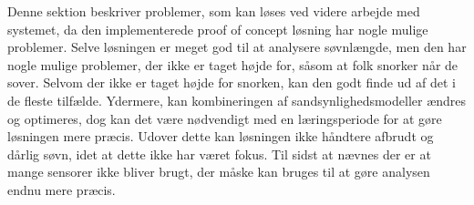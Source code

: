 Denne sektion beskriver problemer, som kan løses ved videre arbejde med systemet, da den implementerede proof of concept løsning har nogle mulige problemer.
Selve løsningen er meget god til at analysere søvnlængde, men den har nogle mulige problemer, der ikke er taget højde for, såsom at folk snorker når de sover.
Selvom der ikke er taget højde for snorken, kan den godt finde ud af det i de fleste tilfælde.
Ydermere, kan kombineringen af sandsynlighedsmodeller ændres og optimeres, dog kan det være nødvendigt med en læringsperiode for at gøre løsningen mere præcis.
Udover dette kan løsningen ikke håndtere afbrudt og dårlig søvn, idet at dette ikke har været fokus.
Til sidst at nævnes der er at mange sensorer ikke bliver brugt, der måske kan bruges til at gøre analysen endnu mere præcis.
